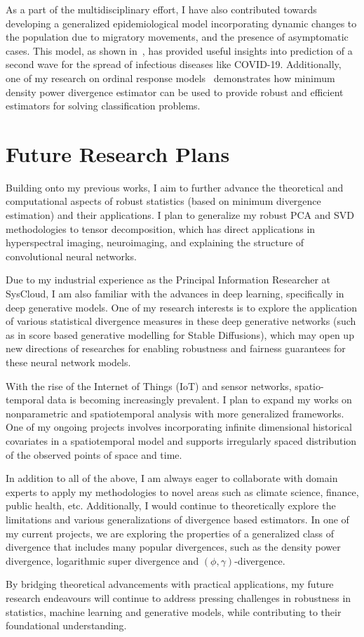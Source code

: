 \documentclass[a4paper,10pt]{article}
\begin{document}
As a part of the multidisciplinary effort, I have also contributed towards developing a generalized epidemiological model incorporating dynamic changes to the population due to migratory movements, and the presence of asymptomatic cases. This model, as shown in~\cite{ghatak2022generalized}, has provided useful insights into prediction of a second wave for the spread of infectious diseases like COVID-19. Additionally, one of my research on ordinal response models~\cite{pyne2024robust} demonstrates how minimum density power divergence estimator can be used to provide robust and efficient estimators for solving classification problems.


\section*{Future Research Plans}

Building onto my previous works, I aim to further advance the theoretical and computational aspects of robust statistics (based on minimum divergence estimation) and their applications. I plan to generalize my robust PCA and SVD methodologies to tensor decomposition, which has direct applications in hyperspectral imaging, neuroimaging, and explaining the structure of convolutional neural networks. 

Due to my industrial experience as the Principal Information Researcher at SysCloud, I am also familiar with the advances in deep learning, specifically in deep generative models. One of my research interests is to explore the application of various statistical divergence measures in these deep generative networks (such as in score based generative modelling for Stable Diffusions), which may open up new directions of researches for enabling robustness and fairness guarantees for these neural network models. 

With the rise of the Internet of Things (IoT) and sensor networks, spatio-temporal data is becoming increasingly prevalent. I plan to expand my works on nonparametric and spatiotemporal analysis with more generalized frameworks. One of my ongoing projects involves incorporating infinite dimensional historical covariates in a spatiotemporal model and supports irregularly spaced distribution of the observed points of space and time.

In addition to all of the above, I am always eager to collaborate with domain experts to apply my methodologies to novel areas such as climate science, finance, public health, etc. Additionally, I would continue to theoretically explore the limitations and various generalizations of divergence based estimators. In one of my current projects, we are exploring the properties of a generalized class of divergence that includes many popular divergences, such as the density power divergence, logarithmic super divergence and $(\phi,\gamma)$-divergence.

By bridging theoretical advancements with practical applications, my future research endeavours will continue to address pressing challenges in robustness in statistics, machine learning and generative models, while contributing to their foundational understanding. 



\end{document}
